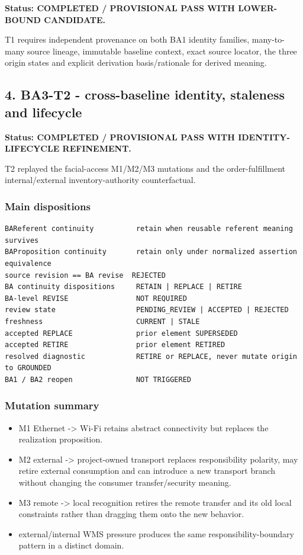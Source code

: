 \documentclass[11pt,a4paper]{article}
\providecommand{\tightlist}{\setlength{\itemsep}{0pt}\setlength{\parskip}{0pt}}\setlength{\emergencystretch}{4em}\hbadness=10000\hfuzz=20pt\sloppy
\begin{document}
\textbf{Status: COMPLETED / PROVISIONAL PASS WITH LOWER-BOUND
CANDIDATE.}

T1 requires independent provenance on both BA1 identity families,
many-to-many source lineage, immutable baseline context, exact source
locator, the three origin states and explicit derivation basis/rationale
for derived meaning.

\subsection{4. BA3-T2 - cross-baseline identity, staleness and
lifecycle}\label{ba3-t2---cross-baseline-identity-staleness-and-lifecycle}

\textbf{Status: COMPLETED / PROVISIONAL PASS WITH IDENTITY-LIFECYCLE
REFINEMENT.}

T2 replayed the facial-access M1/M2/M3 mutations and the
order-fulfillment internal/external inventory-authority counterfactual.

\subsubsection{Main dispositions}\label{main-dispositions}

\begin{verbatim}
BAReferent continuity          retain when reusable referent meaning survives
BAProposition continuity       retain only under normalized assertion equivalence
source revision == BA revise  REJECTED
BA continuity dispositions     RETAIN | REPLACE | RETIRE
BA-level REVISE                NOT REQUIRED
review state                   PENDING_REVIEW | ACCEPTED | REJECTED
freshness                      CURRENT | STALE
accepted REPLACE               prior element SUPERSEDED
accepted RETIRE                prior element RETIRED
resolved diagnostic            RETIRE or REPLACE, never mutate origin to GROUNDED
BA1 / BA2 reopen               NOT TRIGGERED
\end{verbatim}

\subsubsection{Mutation summary}\label{mutation-summary}

\begin{itemize}
\tightlist
\item
  M1 Ethernet -\textgreater{} Wi-Fi retains abstract connectivity but
  replaces the realization proposition.
\item
  M2 external -\textgreater{} project-owned transport replaces
  responsibility polarity, may retire external consumption and can
  introduce a new transport branch without changing the consumer
  transfer/security meaning.
\item
  M3 remote -\textgreater{} local recognition retires the remote
  transfer and its old local constraints rather than dragging them onto
  the new behavior.
\item
  external/internal WMS pressure produces the same
  responsibility-boundary pattern in a distinct domain.
\end{itemize}
\end{document}
